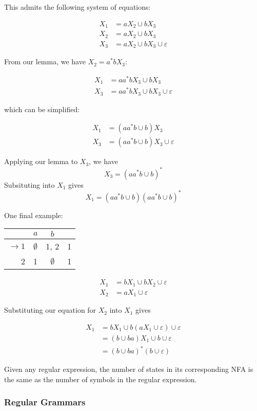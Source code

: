  This admits the following system of equations:

 \begin{align*}
      X_1 &= aX_2\cup bX_3\\
      X_2 &= aX_2\cup bX_3\\
      X_3 &= aX_2\cup bX_3\cup\varepsilon
\end{align*}

From our lemma, we have $X_2=a^*bX_3$:

\begin{align*}
      X_1 &= aa^*bX_3\cup bX_3\\
      X_3 &= aa^*bX_3\cup bX_3\cup\varepsilon
\end{align*}

which can be simplified:

\begin{align*}
      X_1 &= (aa^*b\cup b)X_3\\
      X_3 &= (aa^*b\cup b)X_3\cup\varepsilon
\end{align*}

Applying our lemma to $X_3$, we have \[X_3=(aa^*b\cup b)^*\] Subsituting into $X_1$ gives \[X_1=(aa^*b\cup b)(aa^*b\cup b)^*\] 

One final example:

\begin{center}\begin{tabular}{r| c c r}
      & $a$ & $b$ & \\\hline
      $\to 1$ & $\emptyset$ & 1, 2 & 1\\
            2 & 1 & $\emptyset$ & 1\\
 \end{tabular}\end{center}

\begin{align*}
      X_1 &= bX_1\cup bX_2\cup\varepsilon\\
      X_2 &= aX_1\cup\varepsilon
\end{align*}

Substituting our equation for $X_2$ into $X_1$ gives 

\begin{align*}
      X_1&=bX_1\cup b(aX_1\cup\varepsilon)\cup\varepsilon\\
         &=(b\cup ba)X_1\cup b\cup\varepsilon\\
         &=(b\cup ba)^*(b\cup\varepsilon)
\end{align*}

Given any regular expression, the number of states in its corresponding NFA is the same as the number of symbols in the regular expression. 
\subsubsection{Regular Grammars}
